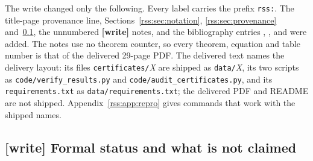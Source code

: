 \documentclass[11pt,a4paper]{article}
\theoremstyle{definition}
\theoremstyle{remark}
\newcommand{\code}[1]{{\small\nolinkurl{#1}}}
\begin{document}
The write changed only the following. Every label carries the prefix
\code{rss:}. The title-page provenance line, Sections~\ref{rss:sec:notation},
\ref{rss:sec:provenance} and~\ref{rss:sec:nonclaims}, the unnumbered
\textbf{[write]} notes, and the bibliography entries \cite{repoFourierRocq},
\cite{repoSextic}, \cite{repoKummer} and \cite{repoCounterexamples} were
added. The notes use no theorem counter, so every theorem, equation and
table number is that of the delivered 29-page PDF. The delivered text names
the delivery layout: its files \code{certificates/}\emph{X} are shipped as
\code{data/}\emph{X}, its two scripts as \code{code/verify_results.py} and
\code{code/audit_certificates.py}, and its \code{requirements.txt} as
\code{data/requirements.txt}; the delivered PDF and README are not shipped.
Appendix~\ref{rss:app:repro} gives commands that work with the shipped names.

\subsection{[write] Formal status and what is not claimed}
\label{rss:sec:nonclaims}
\end{document}
